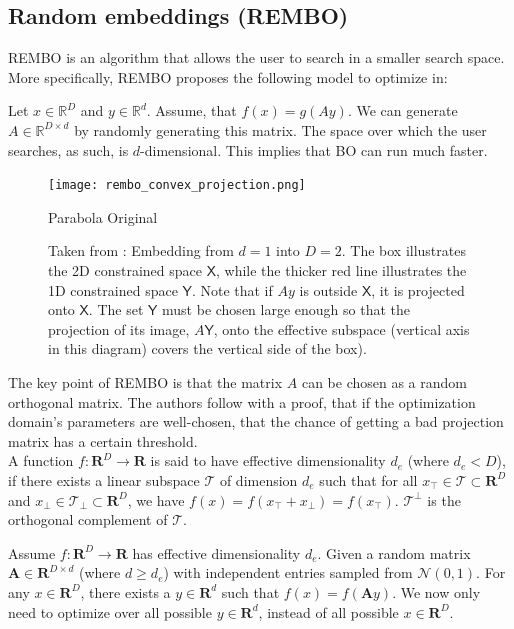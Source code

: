 \documentclass[a4paper,12pt,twoside,openright]{report}
\begin{document}
\subsection{Random embeddings (REMBO)}
REMBO is an algorithm that allows the user to search in a smaller search space.
More specifically, REMBO proposes the following model to optimize in:


\citep{Wang2013} Let $x \in \mathbb{R}^D$ and $y \in \mathbb{R}^d$. Assume, that $f(x) = g(Ay)$. We can generate $A \in \mathbb{R}^{D \times d}$ by randomly generating this matrix.
The space over which the user searches, as such, is $d$-dimensional.
This implies that BO can run much faster. \\

\begin{figure}[H]
    \centering
        \texttt{[image: rembo\_convex\_projection.png]}
        \caption{Parabola Original}
        \label{fig:gull}
    \caption{
    Taken from \citep{Wang2013}: Embedding from $d = 1$ into $D=2$.
    The box illustrates the 2D constrained space $\mathsf{X}$, while the thicker red line illustrates the 1D constrained space $\mathsf{Y}$.
    Note that if $Ay$ is outside $\mathsf{X}$, it is projected onto $\mathsf{X}$.
    The set $\mathsf{Y}$ must be chosen large enough so that the projection of its image, $A\mathsf{Y}$, onto the effective subspace (vertical axis in this diagram) covers the vertical side of the box).
    }\label{fig:animals}
\end{figure}

The key point of REMBO is that the matrix $A$ can be chosen as a random orthogonal matrix.
The authors follow with a proof, that if the optimization domain's parameters are well-chosen, that the chance of getting a bad projection matrix has a certain threshold. \\

\cite{Wang}
A function $f : \mathbf{R}^D \rightarrow \mathbf{R}$ is said to have effective dimensionality $d_e$ (where $d_e < D$), if there exists a linear subspace $\mathcal{T}$ of dimension $d_e$ such that for all $ x_\top \in \mathcal{T} \subset \mathbf{R}^D $ and $x_\perp \in \mathcal{T_\perp} \subset \mathbf{R}^D $, we have $ f(x) = f(x_\top +x_\perp ) = f(x_\top)$.
$\mathcal{T^\perp}$ is the orthogonal complement of $\mathcal{T}$.

Assume $ f : \mathbf{R}^D \rightarrow \mathbf{R} $ has effective dimensionality $d_e$.
Given a random matrix $ \mathbf{A} \in \mathbf{R}^{D \times d} $ (where $d \geq d_e$) with independent entries sampled from $ \mathcal{N}(0, 1) $.
For any $ x \in \mathbf{R}^D $, there exists a $y \in \mathbf{R}^d $ such that $ f(x) = f(\mathbf{A} y ) $.
We now only need to optimize over all possible $y \in \mathbf{R}^d$, instead of all possible $x \in \mathbf{R}^D $. \\
\end{document}
